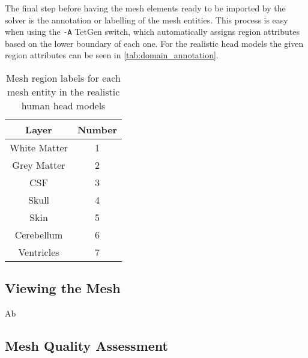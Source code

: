 The final step before having the mesh elements ready to be imported by the solver is the annotation or labelling of the mesh entities. This process is easy when using the \texttt{-A} TetGen \cite{tetgen} switch, which automatically assigns region attributes based on the lower boundary of each one. For the realistic head models the given region attributes can be seen in \autoref{tab:domain_annotation}.

\begin{table}[!ht]
	\centering
	\caption{Mesh region labels for each mesh entity in the realistic human head models}
	\label{tab:domain_annotation}
	\begin{tabular}{|c|c|}
		\hline
		\rowcolor[HTML]{C0C0C0} 
		{\color[HTML]{000000} \textbf{Layer}} & {\color[HTML]{000000} \textbf{Number}} \\ \hline
		White Matter & 1 \\ \hline
		Grey Matter & 2 \\ \hline
		\gls{CSF} & 3 \\ \hline
		Skull & 4 \\ \hline
		Skin & 5 \\ \hline
		Cerebellum & 6 \\ \hline
		Ventricles & 7 \\ \hline
	\end{tabular}
\end{table}


\subsection{Viewing the Mesh}
Ab

\subsection{Mesh Quality Assessment}
\label{sec:mesh_quality}

